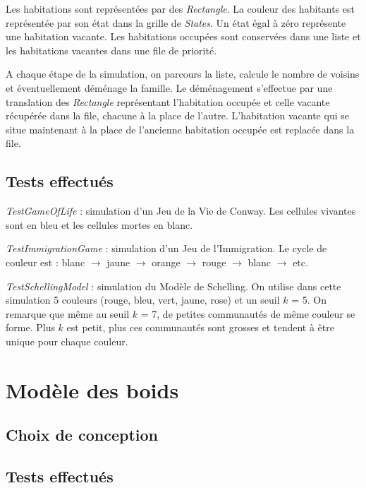 \documentclass[a4paper, 11pt]{article}
\begin{document}
Les habitations sont représentées par des \textit{Rectangle}. La couleur des habitants est représentée par son état dans la grille de \textit{States}. Un état égal à zéro représente une habitation vacante. Les habitations occupées sont conservées dans une liste et les habitations vacantes dans une file de priorité.

A chaque étape de la simulation, on parcours la liste, calcule le nombre de voisins et éventuellement déménage la famille. Le déménagement s'effectue par une translation des \textit{Rectangle} représentant l'habitation occupée et celle vacante récupérée dans la file, chacune à la place de l'autre. L'habitation vacante qui se situe maintenant à la place de l'ancienne habitation occupée est replacée dans la file.


\subsection*{Tests effectués}

\textit{TestGameOfLife} : simulation d'un Jeu de la Vie de Conway. Les cellules vivantes sont en bleu et les cellules mortes en blanc.

\textit{TestImmigrationGame} : simulation d'un Jeu de l'Immigration. Le cycle de couleur est : blanc $\rightarrow$ jaune $\rightarrow$ orange $\rightarrow$ rouge $\rightarrow$ blanc $\rightarrow$ etc.

\textit{TestSchellingModel} : simulation du Modèle de Schelling. On utilise dans cette simulation 5 couleurs (rouge, bleu, vert, jaune, rose) et un seuil $k$ = 5. On remarque que même au seuil $k$ = 7, de petites communautés de même couleur se forme. Plus $k$ est petit, plus ces communautés sont grosses et tendent à être unique pour chaque couleur.

\section{Modèle des boids}

\subsection*{Choix de conception}


\subsection*{Tests effectués}
\end{document}
